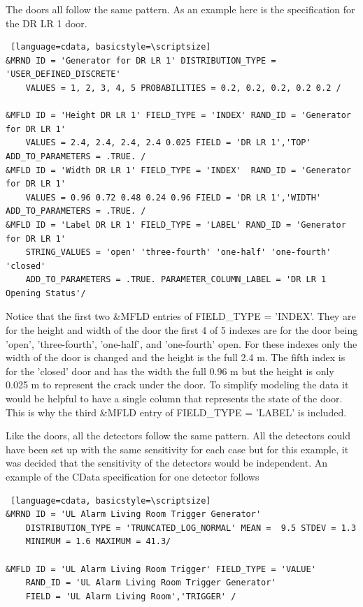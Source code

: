 \documentclass[12pt,twoside]{book}
\begin{document}
The doors all follow the same pattern. As an example here is the specification for the DR LR 1 door.

\vspace{\baselineskip}
\begin{lstlisting} [language=cdata, basicstyle=\scriptsize]
&MRND ID = 'Generator for DR LR 1' DISTRIBUTION_TYPE = 'USER_DEFINED_DISCRETE'
	VALUES = 1, 2, 3, 4, 5 PROBABILITIES = 0.2, 0.2, 0.2, 0.2 0.2 /

&MFLD ID = 'Height DR LR 1' FIELD_TYPE = 'INDEX' RAND_ID = 'Generator for DR LR 1'  
	VALUES = 2.4, 2.4, 2.4, 2.4 0.025 FIELD = 'DR LR 1','TOP' ADD_TO_PARAMETERS = .TRUE. /
&MFLD ID = 'Width DR LR 1' FIELD_TYPE = 'INDEX'  RAND_ID = 'Generator for DR LR 1'  
	VALUES = 0.96 0.72 0.48 0.24 0.96 FIELD = 'DR LR 1','WIDTH' ADD_TO_PARAMETERS = .TRUE. /
&MFLD ID = 'Label DR LR 1' FIELD_TYPE = 'LABEL' RAND_ID = 'Generator for DR LR 1' 
	STRING_VALUES = 'open' 'three-fourth' 'one-half' 'one-fourth' 'closed' 
	ADD_TO_PARAMETERS = .TRUE. PARAMETER_COLUMN_LABEL = 'DR LR 1 Opening Status'/
\end{lstlisting}

Notice that the first two  {\ct \&MFLD} entries of  {\ct FIELD\_TYPE = 'INDEX'}. They are for the height and width of the door the first 4 of 5 indexes are for the door being 'open', 'three-fourth', 'one-half', and  'one-fourth' open. For these indexes only the width of the door is changed and the height is the full 2.4 m. The fifth index is for the 'closed' door and has the width the full 0.96 m but the height is only 0.025 m to represent the crack under the door. To simplify modeling the data it would be helpful to have a single column that represents the state of the door. This is why the third {\ct \&MFLD} entry of {\ct FIELD\_TYPE = 'LABEL'} is included.

Like the doors, all the detectors follow the same pattern. All the detectors could have been set up with the same sensitivity for each case but for this example, it was decided that the sensitivity of the detectors would be independent. An example of the CData specification for one detector follows

\vspace{\baselineskip}
\begin{lstlisting} [language=cdata, basicstyle=\scriptsize]
&MRND ID = 'UL Alarm Living Room Trigger Generator' 
	DISTRIBUTION_TYPE = 'TRUNCATED_LOG_NORMAL' MEAN =  9.5 STDEV = 1.3 
	MINIMUM = 1.6 MAXIMUM = 41.3/
	
&MFLD ID = 'UL Alarm Living Room Trigger' FIELD_TYPE = 'VALUE' 
	RAND_ID = 'UL Alarm Living Room Trigger Generator'
    FIELD = 'UL Alarm Living Room','TRIGGER' /
\end{lstlisting}
\end{document}
